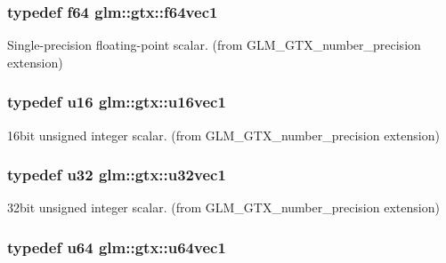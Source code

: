 \subsubsection[{f64vec1}]{\setlength{\rightskip}{0pt plus 5cm}typedef f64 {\bf glm\+::gtx\+::f64vec1}}\label{group__gtx__number__precision_ga44336a26c958d66efdfb5a6c114c538e}


Single-\/precision floating-\/point scalar. (from G\+L\+M\+\_\+\+G\+T\+X\+\_\+number\+\_\+precision extension) 

\hypertarget{group__gtx__number__precision_ga807d7e5f24e981b1575bd40ca159781d}{}
\subsubsection[{u16vec1}]{\setlength{\rightskip}{0pt plus 5cm}typedef u16 {\bf glm\+::gtx\+::u16vec1}}\label{group__gtx__number__precision_ga807d7e5f24e981b1575bd40ca159781d}


16bit unsigned integer scalar. (from G\+L\+M\+\_\+\+G\+T\+X\+\_\+number\+\_\+precision extension) 

\hypertarget{group__gtx__number__precision_gac46a7890b20928df83e734c3ea9557d4}{}
\subsubsection[{u32vec1}]{\setlength{\rightskip}{0pt plus 5cm}typedef u32 {\bf glm\+::gtx\+::u32vec1}}\label{group__gtx__number__precision_gac46a7890b20928df83e734c3ea9557d4}


32bit unsigned integer scalar. (from G\+L\+M\+\_\+\+G\+T\+X\+\_\+number\+\_\+precision extension) 

\hypertarget{group__gtx__number__precision_ga92812a1d7e746bcaba61d2f5a64afc52}{}
\subsubsection[{u64vec1}]{\setlength{\rightskip}{0pt plus 5cm}typedef u64 {\bf glm\+::gtx\+::u64vec1}}\label{group__gtx__number__precision_ga92812a1d7e746bcaba61d2f5a64afc52}


